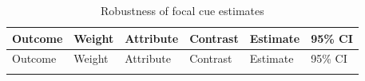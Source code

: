 \documentclass[
  letterpaper,
  DIV=11,
  numbers=noendperiod]{scrartcl}
\begin{document}
\begin{longtable}[]{@{}
  >{\raggedright\arraybackslash}p{}
  >{\raggedright\arraybackslash}p{}
  >{\raggedright\arraybackslash}p{}
  >{\raggedright\arraybackslash}p{}
  >{\raggedleft\arraybackslash}p{}
  >{\raggedright\arraybackslash}p{}@{}}
\caption{Robustness of focal cue
estimates}\label{tbl-robustness}\tabularnewline
\toprule\noalign{}
\begin{minipage}[b]{\linewidth}\raggedright
Outcome
\end{minipage} & \begin{minipage}[b]{\linewidth}\raggedright
Weight
\end{minipage} & \begin{minipage}[b]{\linewidth}\raggedright
Attribute
\end{minipage} & \begin{minipage}[b]{\linewidth}\raggedright
Contrast
\end{minipage} & \begin{minipage}[b]{\linewidth}\raggedleft
Estimate
\end{minipage} & \begin{minipage}[b]{\linewidth}\raggedright
95\% CI
\end{minipage} \\
\midrule\noalign{}
\endfirsthead
\toprule\noalign{}
\begin{minipage}[b]{\linewidth}\raggedright
Outcome
\end{minipage} & \begin{minipage}[b]{\linewidth}\raggedright
Weight
\end{minipage} & \begin{minipage}[b]{\linewidth}\raggedright
Attribute
\end{minipage} & \begin{minipage}[b]{\linewidth}\raggedright
Contrast
\end{minipage} & \begin{minipage}[b]{\linewidth}\raggedleft
Estimate
\end{minipage} & \begin{minipage}[b]{\linewidth}\raggedright
95\% CI
\end{minipage} \\
\midrule\noalign{}
\endhead
\bottomrule\noalign{}

\end{longtable}
\end{document}
